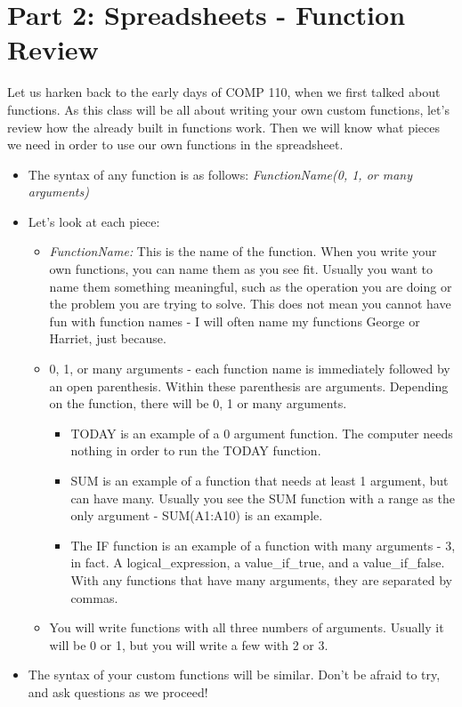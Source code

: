 \documentclass{article}
\begin{document}
\section*{Part 2: Spreadsheets - Function Review}
Let us harken back to the early days of COMP 110, when we first talked about functions.  As this class will be all about writing your own custom functions, let's review how the already built in functions work.  Then we will know what pieces we need in order to use our own functions in the spreadsheet.
\begin{itemize}
	\item  The syntax of any function is as follows: \textit{FunctionName(0, 1, or many arguments)}
	\item Let's look at each piece:
		\begin{itemize}
			\item \textit{FunctionName:}  This is the name of the function.  When you write your own functions, you can name them as you see fit.  Usually you want to name them something meaningful, such as the operation you are doing or the problem you are trying to solve.  This does not mean you cannot have fun with function names - I will often name my functions George or Harriet, just because.
			\item 0, 1, or many arguments - each function name is immediately followed by an open parenthesis.  Within these parenthesis are arguments.  Depending on the function, there will be 0, 1 or many arguments.
				\begin{itemize}
					\item TODAY is an example of a 0 argument function.  The computer needs nothing in order to run the TODAY function.
					\item SUM is an example of a function that needs at least 1 argument, but can have many.  Usually you see the SUM function with a range as the only argument - SUM(A1:A10) is an example.
					\item The IF function is an example of a function with many arguments - 3, in fact.  A logical\_expression, a value\_if\_true, and a value\_if\_false.  With any functions that have many arguments, they are separated by commas.
				\end{itemize}
			\item You will write functions with all three numbers of arguments.  Usually it will be 0 or 1, but you will write a few with 2 or 3.
		\end{itemize}
	\item The syntax of your custom functions will be similar.  Don't be afraid to try, and ask questions as we proceed!
\end{itemize}
\end{document}
